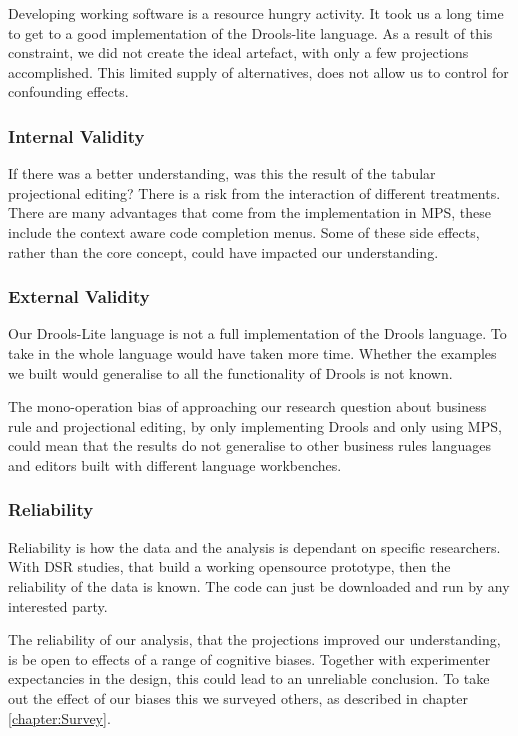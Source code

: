 Developing working software is a resource hungry activity. 
It took us a long time to get to a good implementation of the Drools-lite language.
As a result of this constraint, we did not create the ideal artefact, with only a few projections accomplished.
This limited supply of alternatives, does not allow us to control for confounding effects.

\subsubsection{Internal Validity}
If there was a better understanding, was this the result of the tabular projectional editing?
There is a risk from the interaction of different treatments.
There are many advantages that come from the implementation in MPS, these include the context aware code completion menus.
Some of these side effects, rather than the core concept, could have impacted our understanding.

\subsubsection{External Validity}
Our Drools-Lite language is not a full implementation of the Drools language.
To take in the whole language would have taken more time.
Whether the examples we built would generalise to all the functionality of Drools is not known.

The mono-operation bias of approaching our research question about business rule and projectional editing, by only implementing Drools and only using MPS, could mean that the results do not generalise to other business rules languages and editors built with different language workbenches. 

\subsubsection{Reliability}
Reliability is how the data and the analysis is dependant on specific researchers.
With DSR studies, that build a working opensource prototype, then the reliability of the data is known.
The code can just be downloaded and run by any interested party.  

The reliability of our analysis, that the projections improved our understanding, is be open to effects of a range of cognitive biases.
Together with experimenter expectancies in the design, this could lead to an unreliable conclusion. 
To take out the effect of our biases this we surveyed others, as described in chapter \ref{chapter:Survey}.
